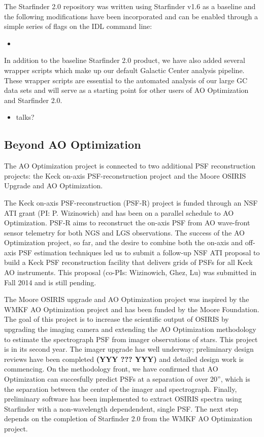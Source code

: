 The Starfinder 2.0 repository was written using Starfinder v1.6 as a
baseline and the following modifications have been incorporated and
can be enabled through a simple series of flags on the IDL command
line:
\begin{itemize}
\item
\end{itemize}
In addition to the baseline Starfinder 2.0 product, we have also
added several wrapper scripts which make up our default Galactic
Center analysis pipeline. These wrapper scripts are essential to the
automated analysis of our large GC data sets and will serve as a
starting point for other users of AO Optimization and Starfinder 2.0.

\begin{itemize}
\item talks? 
\end{itemize}

\subsection{Beyond AO Optimization}

The AO Optimization project is connected to two additional PSF
reconstruction projects: the Keck on-axis PSF-reconstruction project
and the Moore OSIRIS Upgrade and AO Optimization. 

The Keck on-axis PSF-reconstruction (PSF-R) project is 
funded through an NSF ATI grant (PI: P. Wizinowich) and has
been on a parallel schedule to AO Optimization.  
PSF-R aims to reconstruct the on-axis PSF from AO
wave-front sensor telemetry for both NGS and LGS observations. 
The success of the AO Optimization project, so far, and the desire to
combine both the on-axis and off-axis PSF estimation techniques led us
to submit a follow-up NSF ATI proposal to build a Keck PSF
reconstruction facility that delivers grids of PSFs for all Keck AO
instruments. This proposal (co-PIs: Wizinowich, Ghez, Lu) was submitted 
in Fall 2014 and is still pending. 

The Moore OSIRIS upgrade and AO Optimization project
was inspired by the WMKF AO Optimization project and has been funded
by the Moore Foundation. 
The goal of this project is to increase the scientific output of
OSIRIS by upgrading the imaging camera and extending the AO
Optimization methodology to estimate the spectrograph PSF from imager
observations of stars. This project is in its second year.
The imager upgrade has well underway; preliminary design reviews
have been completed \textbf{(YYY ??? YYY)} and detailed design work is
commencing.
On the methodology front, we have confirmed that AO Optimization can
succesfully predict PSFs at a separation of over 20'', which is the
separation between the center of the imager and spectrograph.
Finally, preliminary software has been implemented to extract OSIRIS
spectra using Starfinder with a non-wavelength dependendent, single
PSF. The next step depends on the completion of Starfinder 2.0 from
the WMKF AO Optimization project. 




